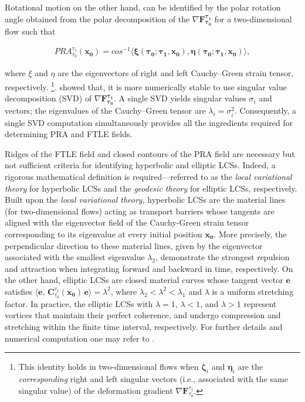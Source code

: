\documentclass[aps,prfluids,reprint,nofootinbib,onecolumn,groupedaddress,showkeys]{revtex4-2}
\begin{document}
	Rotational motion on the other hand, can be identified by the polar rotation angle obtained from the polar decomposition of the $\nabla\mathbf{F_{\tau_0}^{\tau_1}}$ for a two-dimensional flow such that 
	
	\begin{align}
		PRA_{\tau_0}^{\tau_1}(\mathbf{x_0}) = cos^{-1}\langle \mathbf{\xi(\mathbf{\tau_0;\tau_1,x_0})}, \mathbf{\eta(\mathbf{\tau_0;\tau_1,x_0})} \rangle,
		\label{eq 4} 
	\end{align}
	
	\noindent where $\xi$ and $\eta$ are the eigenvectors of right and left Cauchy–Green strain tensor, respectively. \footnote{
		This identity holds in two-dimensional flows when $\boldsymbol{\zeta}_i$ and $\boldsymbol{\eta}_i$ are the \textit{corresponding} right and left singular vectors (i.e., associated with the same singular value) of the deformation gradient $\nabla\mathbf{F}_{\tau_0}^{\tau_1}$.}. \citet{Karrasch2015} showed that, {\color{black} it is more numerically stable to use singular value decomposition (SVD) of $\nabla\mathbf{F_{\tau_0}^{\tau_1}}$. A single SVD {\color{black}yields} {\color{black}singular} {\color{black}values} $\sigma_i$ and vectors; the eigenvalues of the Cauchy–Green tensor are {\color{black}$\lambda_i=\sigma_i^2$}. Consequently, a single SVD computation simultaneously provides all the ingredients required for} determining PRA and FTLE fields.
	
	Ridges of the FTLE field and closed contours of the PRA field are necessary but not sufficient criteria for identifying hyperbolic and elliptic LCSs. Indeed, a rigorous mathematical definition is required—referred to as the \textit{local variational theory} \cite{Farazmand_haller2012} for hyperbolic LCSs and the \textit{geodesic theory} \cite{Serra_haller2017} for elliptic LCSs, respectively. Built upon the \textit{local variational theory}, hyperbolic LCSs are the material lines (for two-dimensional flows) acting as transport barriers whose tangents are aligned with the eigenvector field of the Cauchy-Green strain tensor corresponding to its eigenvalue at every initial position $\mathbf{x_0}$. More precisely, the perpendicular direction to these material lines, given by the eigenvector associated with the smallest eigenvalue $\lambda_2$, demonstrate the strongest repulsion and attraction when integrating forward and backward in time, respectively. On the other hand, elliptic LCSs are closed material curves whose tangent vector $\boldsymbol{e}$ satisfies $\langle \boldsymbol{e},\, \mathbf{C}_{\tau_0}^{\tau_1}(\mathbf{x_0})\, \boldsymbol{e} \rangle = \lambda^2$, where $\lambda_2 < \lambda^2 < \lambda_1$ and $\lambda$ is a uniform stretching factor. In practice, the elliptic LCSs with $\lambda = 1$, $\lambda < 1$, and $\lambda > 1$ represent vortices that maintain their perfect coherence, and undergo compression and stretching within the finite time interval, respectively. For further details and numerical computation one may refer to \cite{Haller2023}.
	
\end{document}
